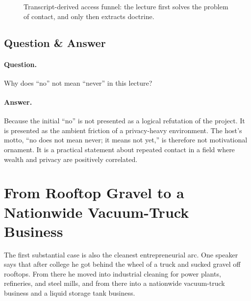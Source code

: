 \begin{figure}[h]
\centering
{}
\caption{Transcript-derived access funnel: the lecture first solves the problem of contact, and only then extracts doctrine.}
\end{figure}

\subsection{Question \& Answer}

\paragraph{Question.} Why does ``no'' not mean ``never'' in this lecture?

\paragraph{Answer.} Because the initial ``no'' is not presented as a logical refutation of the project. It is presented as the ambient friction of a privacy-heavy environment. The host's motto, ``no does not mean never; it means not yet,'' is therefore not motivational ornament. It is a practical statement about repeated contact in a field where wealth and privacy are positively correlated.

\section{From Rooftop Gravel to a Nationwide Vacuum-Truck Business}

The first substantial case is also the cleanest entrepreneurial arc. One speaker says that after college he got behind the wheel of a truck and sucked gravel off rooftops. From there he moved into industrial cleaning for power plants, refineries, and steel mills, and from there into a nationwide vacuum-truck business and a liquid storage tank business.

